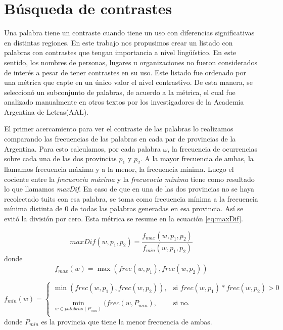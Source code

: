 \section{Búsqueda de contrastes}

Una palabra tiene un contraste cuando tiene un uso con diferencias significativas en
distintas regiones. En este trabajo nos propusimos crear un listado con palabras con contrastes que tengan
importancia a nivel lingüístico. En este sentido, los nombres de personas, lugares u organizaciones no 
fueron considerados de interés a pesar de tener contrastes en su uso.
Este listado fue ordenado por una métrica que capte en un único valor el nivel contrastivo. De esta manera, 
se seleccionó un subconjunto de palabras, de acuerdo a la métrica, el cual fue analizado manualmente en otros textos por los investigadores de la Academia Argentina de Letras(AAL).

El primer acercamiento para ver el contraste de las palabras lo realizamos comparando las frecuencias de las palabras 
en cada par de provincias de la Argentina. Para esto calculamos, por cada palabra $\omega$, la frecuencia de ocurrencias sobre cada una de las dos provincias $p_1$ y $p_2$. A la mayor frecuencia de ambas, la llamamos frecuencia máxima y a la menor, la frecuencia mínima. Luego el cociente entre la \textit{frecuencia máxima} y la \textit{frecuencia mínima} tiene como resultado lo que llamamos \textit{maxDif}. En caso de que en una de las dos provincias no se haya 
recolectado tuits con esa palabra, se toma como frecuencia mínima a la frecuencia mínima distinta de 0 de todas las palabras generadas en esa provincia. Así se evitó la división por cero. Esta métrica se resume en la ecuación \ref{eq:maxDif}.


\begin{equation}
  \label{eq:maxDif} 
  maxDif(w,p_1,p_2) = \frac{f_{max}(w,p_1,p_2)}{f_{min}(w,p_1,p_2)}
\end{equation}
donde 
\begin{equation}
f_{max}(w) = \max (frec(w,p_1),frec(w,p_2))
\end{equation}

\begin{equation}
 f_{min}(w) = \left\{ \begin{array}{lll}
             \min(frec(w,p_1),frec(w,p_2)), & \text{si } frec(w,p_1) * frec(w,p_2) > 0  & \\
             \\
             \min\limits_{w \in palabras(P_{min})} (frec(w,P_{min}) , &  \text{si no.} &  \\
             \end{array}
   \right.
\end{equation}
   donde $P_{min}$ es la provincia que tiene la menor frecuencia de ambas.



